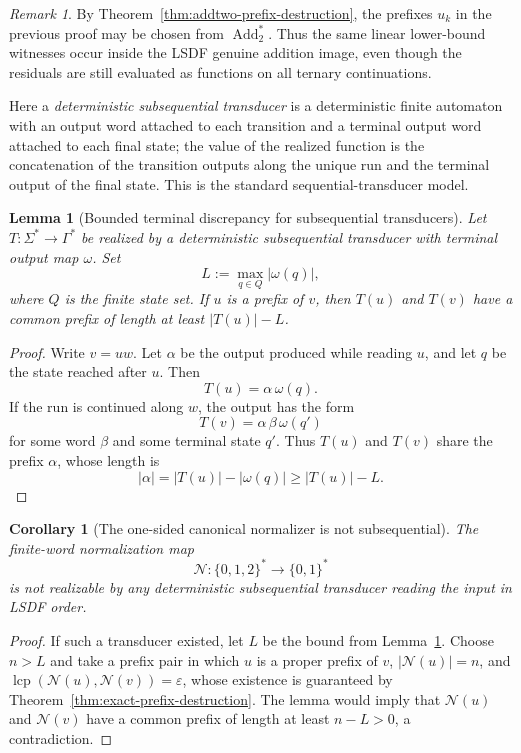 \documentclass[11pt,letterpaper]{article}
\numberwithin{equation}{section}
\theoremstyle{plain}
\newtheorem{lemma}[theorem]{Lemma}
\newtheorem{corollary}[theorem]{Corollary}
\theoremstyle{definition}
\theoremstyle{remark}
\newtheorem{remark}[theorem]{Remark}
\DeclareMathOperator{\lcp}{lcp}
\newcommand{\AddTwo}{\operatorname{Add}_{2}}
\begin{document}
\begin{remark}
By Theorem~\ref{thm:addtwo-prefix-destruction}, the prefixes $u_k$ in the
previous proof may be chosen from $\AddTwo^\ast$.  Thus the same linear
lower-bound witnesses occur inside the LSDF genuine addition image, even though
the residuals are still evaluated as functions on all ternary continuations.
\end{remark}

Here a \emph{deterministic subsequential transducer} is a deterministic finite
automaton with an output word attached to each transition and a terminal output
word attached to each final state; the value of the realized function is the
concatenation of the transition outputs along the unique run and the terminal
output of the final state.  This is the standard sequential-transducer model.

\begin{lemma}[Bounded terminal discrepancy for subsequential transducers]\label{lem:subseq-terminal-bound}
Let $T:\Sigma^\ast\to\Gamma^\ast$ be realized by a deterministic
subsequential transducer with terminal output map $\omega$.  Set
\[
L:=\max_{q\in Q} |\omega(q)|,
\]
where $Q$ is the finite state set.
If $u$ is a prefix of $v$, then $T(u)$ and $T(v)$ have a common prefix of
length at least $|T(u)|-L$.
\end{lemma}

\begin{proof}
Write $v=uw$.  Let $\alpha$ be the output produced while reading $u$, and let
$q$ be the state reached after $u$.  Then
\[
T(u)=\alpha\,\omega(q).
\]
If the run is continued along $w$, the output has the form
\[
T(v)=\alpha\,\beta\,\omega(q')
\]
for some word $\beta$ and some terminal state $q'$.  Thus $T(u)$ and $T(v)$
share the prefix $\alpha$, whose length is
\[
|\alpha|=|T(u)|-|\omega(q)|\ge |T(u)|-L.
\]
\end{proof}

\begin{corollary}[The one-sided canonical normalizer is not subsequential]\label{thm:canonical-not-subsequential}
The finite-word normalization map
\[
\mathcal N:\{0,1,2\}^\ast\to\{0,1\}^\ast
\]
is not realizable by any deterministic subsequential transducer reading the
input in LSDF order.
\end{corollary}

\begin{proof}
If such a transducer existed, let $L$ be the bound from
Lemma~\ref{lem:subseq-terminal-bound}.  Choose $n>L$ and take a prefix pair
in which $u$ is a proper prefix of $v$, $|\mathcal N(u)|=n$, and
$\lcp(\mathcal N(u),\mathcal N(v))=\varepsilon$, whose existence is guaranteed by
Theorem~\ref{thm:exact-prefix-destruction}.  The lemma would imply that
$\mathcal N(u)$ and $\mathcal N(v)$ have a common prefix of length at least
$n-L>0$, a contradiction.
\end{proof}
\end{document}
